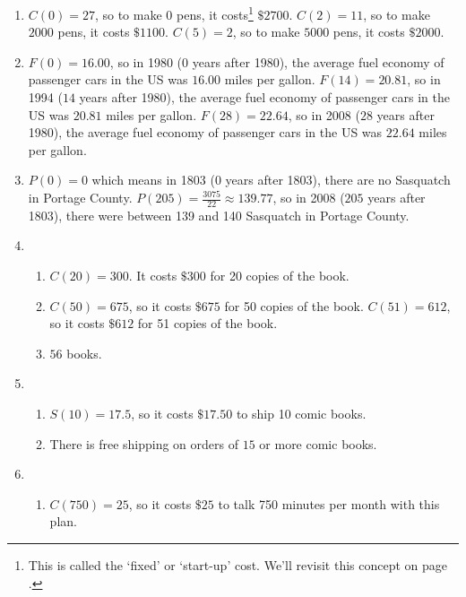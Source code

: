 \begin{enumerate}
\item $C(0) = 27$, so to make $0$ pens, it costs\footnote{This is called the `fixed' or `start-up' cost.  We'll revisit this concept on page \pageref{pricerevenuecostprofit}.} $\$ 2700$.  $C(2) = 11$, so to make $2000$ pens, it costs $\$1100$.  $C(5) = 2$, so to make $5000$ pens, it costs $\$2000$.

\item $F(0) = 16.00$, so in 1980 ($0$ years after 1980), the average fuel economy of passenger cars in the US was $16.00$ miles per gallon.  $F(14) = 20.81$, so in 1994 ($14$ years after 1980), the average fuel economy of passenger cars in the US was $20.81$ miles per gallon.  $F(28) = 22.64$, so in 2008 ($28$ years after 1980), the average fuel economy of passenger cars in the US was $22.64$ miles per gallon.  


\item $P(0) = 0$ which means in 1803 ($0$ years after 1803), there are no Sasquatch in Portage County.  $P(205) = \frac{3075}{22} \approx 139.77$, so in 2008 ($205$ years after 1803), there were between 139 and 140 Sasquatch in Portage County.

\item \begin{enumerate}

\item $C(20) = 300$.  It costs $\$300$ for 20 copies of the book.

\item $C(50) = 675$, so it costs $\$ 675$ for 50 copies of the book.  $C(51) = 612$, so it costs $\$ 612$ for 51 copies of the book.

\item $56$ books.

\end{enumerate}

\item \begin{enumerate}

\item  $S(10) = 17.5$, so it costs $\$ 17.50$ to ship 10 comic books.

\item  There is free shipping on orders of $15$ or more comic books. 
 
\end{enumerate}

\item \begin{enumerate}

\item  $C(750) = 25$, so it costs $\$ 25$ to talk 750 minutes per month with this plan.


\end{enumerate}
\end{enumerate}
